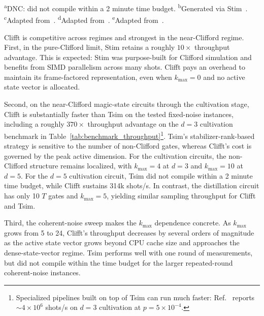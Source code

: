 \documentclass[a4paper, onecolumn, unpublished]{quantumarticle}
\begin{document}
\begin{table}[t]
{\textsuperscript{a}DNC: did not compile within a 2 minute time budget.
\textsuperscript{b}Generated via Stim~\cite{gidneyStimFastStabilizer2021}.
\textsuperscript{c}Adapted from~\cite{gidneyMagicStateCultivation2024}.
\textsuperscript{d}Adapted from~\cite{salesrodriguezExperimentalDemonstrationLogical2025,haenelTsimFastUniversal2026}.
\textsuperscript{e}Adapted from~\cite{tuloupComputingLogicalError2026a}.}
    \label{tab:benchmark_throughput}
    \end{table}

    Clifft is competitive across regimes and strongest in the near-Clifford regime. First, in the pure-Clifford limit, Stim retains a roughly $10\times$ throughput advantage. This is expected: Stim was purpose-built for Clifford simulation and benefits from SIMD parallelism across many shots. Clifft pays an overhead to maintain its frame-factored representation, even when $k_{\max}=0$ and no active state vector is allocated.

    Second, on the near-Clifford magic-state circuits through the cultivation stage, Clifft is substantially faster than Tsim on the tested fixed-noise instances, including a roughly $370\times$ throughput advantage on the $d{=}3$ cultivation benchmark in Table~\ref{tab:benchmark_throughput}\footnote{Specialized pipelines built on top of Tsim can run much faster: Ref.~\cite{wanSimulatingMagicState2026a} reports ${\sim}4{\times}10^6$ shots/s on $d{=}3$ cultivation at $p=5{\times}10^{-4}$.}. Tsim's stabilizer-rank-based strategy is sensitive to the number of non-Clifford gates, whereas Clifft's cost is governed by the peak active dimension. For the cultivation circuits, the non-Clifford structure remains localized, with $k_{\max}=4$ at $d{=}3$ and $k_{\max}=10$ at $d{=}5$. For the $d{=}5$ cultivation circuit, Tsim did not compile within a 2 minute time budget, while Clifft sustains 314k shots/s. In contrast, the distillation circuit has only 10 $T$ gates and $k_{\max}=5$, yielding similar sampling throughput for Clifft and Tsim.

    Third, the coherent-noise sweep makes the $k_{\max}$ dependence concrete. As $k_{\max}$ grows from 5 to 24, Clifft's throughput decreases by several orders of magnitude as the active state vector grows beyond CPU cache size and approaches the dense-state-vector regime. Tsim performs well with one round of measurements, but did not compile within the time budget for the larger repeated-round coherent-noise instances.
\end{document}
